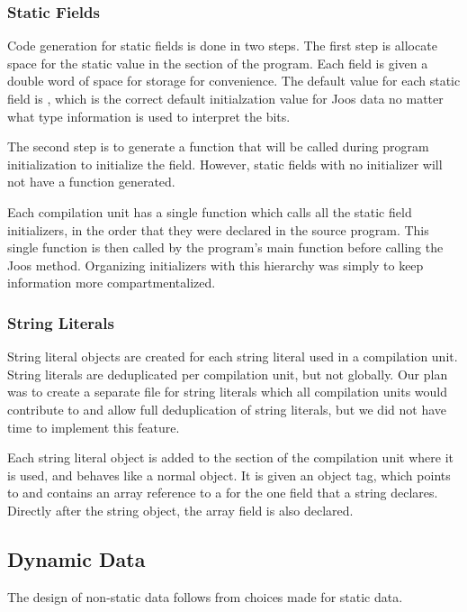 \documentclass[pdftex,11pt,a4paper]{article}
\begin{document}
\subsubsection{Static Fields}

Code generation for static fields is done in two steps. The first step
is allocate space for the static value in the  section of
the program. Each field is given a double word of space for storage
for convenience. The default value for each static field is ,
which is the correct default initialzation value for Joos data no
matter what type information is used to interpret the bits.

The second step is to generate a function that will be called during
program initialization to initialize the field. However, static fields
with no initializer will not have a function generated.

Each compilation unit has a single function which calls all the static
field initializers, in the order that they were declared in the source
program. This single function is then called by the program's main
function before calling the Joos  method. Organizing
initializers with this hierarchy was simply to keep information more
compartmentalized.

\subsubsection{String Literals}

String literal objects are created for each string literal used in a
compilation unit. String literals are deduplicated per compilation
unit, but not globally. Our plan was to create a separate file for
string literals which all compilation units would contribute to and
allow full deduplication of string literals, but we did not have time
to implement this feature.

Each string literal object is added to the  section of the
compilation unit where it is used, and behaves like a normal
object. It is given an object tag, which points to
 and contains an array reference to a
 for the one field that a string declares. Directly after
the string object, the array field is also declared.

\subsection{Dynamic Data}

The design of non-static data follows from choices made for static
data.
\end{document}
